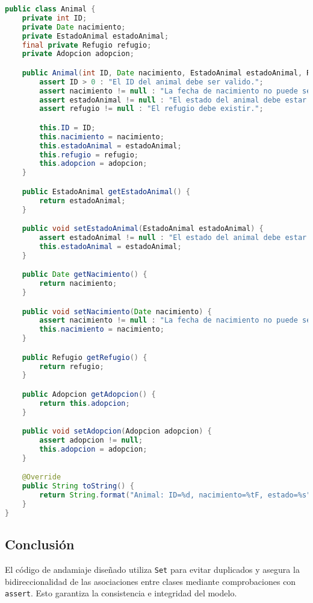 \begin{lstlisting}[language=Java]
public class Animal {
    private int ID;
    private Date nacimiento;
    private EstadoAnimal estadoAnimal;
    final private Refugio refugio;
    private Adopcion adopcion;

    public Animal(int ID, Date nacimiento, EstadoAnimal estadoAnimal, Refugio refugio, Adopcion adopcion) {
        assert ID > 0 : "El ID del animal debe ser valido.";
        assert nacimiento != null : "La fecha de nacimiento no puede ser nula.";
        assert estadoAnimal != null : "El estado del animal debe estar definido.";
        assert refugio != null : "El refugio debe existir.";

        this.ID = ID;
        this.nacimiento = nacimiento;
        this.estadoAnimal = estadoAnimal;
        this.refugio = refugio;
        this.adopcion = adopcion;
    }

    public EstadoAnimal getEstadoAnimal() {
        return estadoAnimal;
    }

    public void setEstadoAnimal(EstadoAnimal estadoAnimal) {
        assert estadoAnimal != null : "El estado del animal debe estar definido.";
        this.estadoAnimal = estadoAnimal;
    }

    public Date getNacimiento() {
        return nacimiento;
    }

    public void setNacimiento(Date nacimiento) {
        assert nacimiento != null : "La fecha de nacimiento no puede ser nula";
        this.nacimiento = nacimiento;
    }

    public Refugio getRefugio() {
        return refugio;
    }

    public Adopcion getAdopcion() {
        return this.adopcion;
    }

    public void setAdopcion(Adopcion adopcion) {
        assert adopcion != null;
        this.adopcion = adopcion;
    }

    @Override
    public String toString() {
        return String.format("Animal: ID=%d, nacimiento=%tF, estado=%s", ID, nacimiento, estadoAnimal);
    }
}
\end{lstlisting}

\subsection{Conclusión}
El código de andamiaje diseñado utiliza \texttt{Set} para evitar duplicados y asegura la bidireccionalidad de las asociaciones entre clases mediante comprobaciones con \texttt{assert}. Esto garantiza la consistencia e integridad del modelo.
